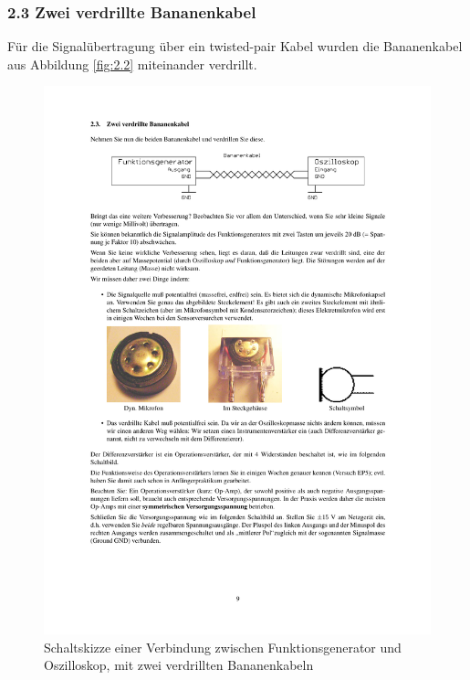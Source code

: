 \documentclass[12pt,a4paper]{article}
\begin{document}
\subsubsection{2.3 Zwei verdrillte Bananenkabel}

Für die Signalübertragung über ein twisted-pair Kabel wurden die Bananenkabel aus Abbildung \ref{fig:2.2} miteinander verdrillt.

\begin{figure}[H] 
  \centering
    \includegraphics[trim = 10mm 230mm 10mm 32mm, clip, scale = 1]{2_3.pdf}
  	\caption[Schaltskizze einer Verbindung zwischen Funktionsgenerator und Oszilloskop, mit zwei verdrillten Bananenkabeln]{Schaltskizze einer Verbindung zwischen Funktionsgenerator und Oszilloskop, mit zwei verdrillten Bananenkabeln\footnotemark}
  \label{fig:2.3}
\end{figure}
\end{document}
